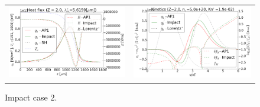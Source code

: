 \begin{figure}[tbh]
  \begin{center}
    \begin{tabular}{cc}
      \includegraphics[width=\figscale\textwidth]{../VFPdata/C7_Impact_case2_heatflux.png} &
      \includegraphics[width=\figscale\textwidth]{../VFPdata/C7_Impact_case2_kinetics.png}
    \end{tabular}
  \caption{  
  Impact case 2.}
  \end{center}
  \label{fig:C7_Impact_case2}
\end{figure}

